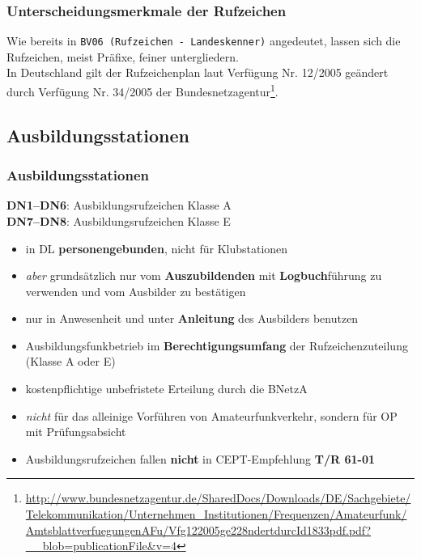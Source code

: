 \begin{frame}
  \frametitle{Unterscheidungsmerkmale der Rufzeichen}

  Wie bereits in \texttt{BV06 (Rufzeichen - Landeskenner)} angedeutet, lassen
  sich die Rufzeichen, meist Präfixe, feiner untergliedern.\\[2em]

  In Deutschland gilt der Rufzeichenplan laut Verfügung Nr. 12/2005 geändert
  durch Verfügung Nr. 34/2005 der
  Bundesnetzagentur\footnote{\ExternalLink\url{http://www.bundesnetzagentur.de/SharedDocs/Downloads/DE/Sachgebiete/Telekommunikation/Unternehmen_Institutionen/Frequenzen/Amateurfunk/AmtsblattverfuegungenAFu/Vfg122005ge228ndertdurcId1833pdf.pdf?__blob=publicationFile&v=4}}.

\end{frame}

\subsection{Ausbildungs\-stationen}

\begin{frame}
  \frametitle{Ausbildungsstationen}

  \textbf{DN1--DN6}: Ausbildungsrufzeichen Klasse A \\
  \textbf{DN7--DN8}: Ausbildungsrufzeichen Klasse E

  \begin{itemize}[<+->]
    \item in DL \textbf{personengebunden}, nicht für Klubstationen
    \item \emph{aber} grundsätzlich nur vom \textbf{Auszubildenden} mit
      \textbf{Logbuch}führung zu verwenden und vom Ausbilder zu bestätigen
    \item nur in Anwesenheit und unter \textbf{Anleitung} des Ausbilders benutzen
    \item Ausbildungsfunkbetrieb im \textbf{Berechtigungsumfang} der
      Rufzeichenzuteilung (Klasse A oder E)
    \item kostenpflichtige unbefristete Erteilung durch die BNetzA
    \item \emph{nicht} für das alleinige Vorführen von Amateurfunkverkehr,
      sondern für OP mit Prüfungsabsicht
    \item Ausbildungsrufzeichen fallen \textbf{nicht} in CEPT-Empfehlung
      \textbf{T/R 61-01}
  \end{itemize}

\end{frame}

